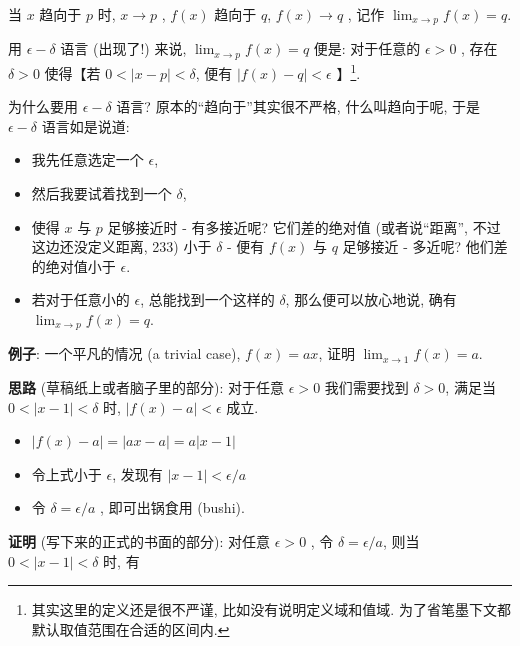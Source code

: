 \begin{tcolorbox}[size=fbox, breakable, enhanced jigsaw, title={极限 (limit)}]

\begin{tcolorbox}[size=fbox, breakable, enhanced jigsaw, title={定义}]
当 $x$ 趋向于 $p$ 时, $x\rightarrow p$ , $f(x)$
趋向于 $q$, $f(x)\rightarrow q$ , 记作
$\lim_{x\rightarrow p}f(x)=q.$

用 $\epsilon - \delta$ 语言 (出现了!) 来说,
$\lim_{x\rightarrow p}f(x)=q$ 便是: 对于任意的 $\epsilon>0$ , 存在
$\delta>0$ 使得【若 $0<|x-p|<\delta$, 便有 $|f(x)-q|<\epsilon$
】\footnote{其实这里的定义还是很不严谨, 比如没有说明定义域和值域.
  为了省笔墨下文都默认取值范围在合适的区间内.}.

\end{tcolorbox}

为什么要用 $\epsilon - \delta$ 语言? 原本的``趋向于''其实很不严格,
什么叫趋向于呢, 于是 $\epsilon - \delta$ 语言如是说道:

\begin{itemize}

\item
  我先任意选定一个 $\epsilon$,
\item
  然后我要试着找到一个 $\delta$,
\item
  使得 $x$ 与 $p$ 足够接近时 - 有多接近呢? 它们差的绝对值
  (或者说``距离'', 不过这边还没定义距离, 233) 小于 $\delta$ - 便有
  $f(x)$ 与 $q$ 足够接近 - 多近呢? 他们差的绝对值小于 $\epsilon$.
\item
  若对于任意小的 $\epsilon$, 总能找到一个这样的 $\delta$,
  那么便可以放心地说, 确有$\lim_{x\rightarrow p}f(x)=q$.
\end{itemize}

\begin{newquote}
\textbf{例子}: 一个平凡的情况 (a trivial case), $f(x)=ax$, 证明
$\lim_{x\rightarrow 1}f(x)=a$.

\textbf{思路} (草稿纸上或者脑子里的部分): 对于任意 $\epsilon>0$
我们需要找到 $\delta>0$, 满足当 $0<|x-1|<\delta$ 时,
$|f(x)-a|<\epsilon$ 成立.

\begin{itemize}
\item
  $|f(x)-a|=|ax-a|=a|x-1|$
\item
  令上式小于 $\epsilon$, 发现有 $|x-1|<\epsilon/a$
\item
  令 $\delta=\epsilon/a$ , 即可出锅食用 (bushi).
\end{itemize}

\textbf{证明} (写下来的正式的书面的部分): 对任意 $\epsilon>0$ , 令
$\delta=\epsilon/a$, 则当 $0<|x-1|<\delta$ 时, 有


\end{newquote}
\end{tcolorbox}
